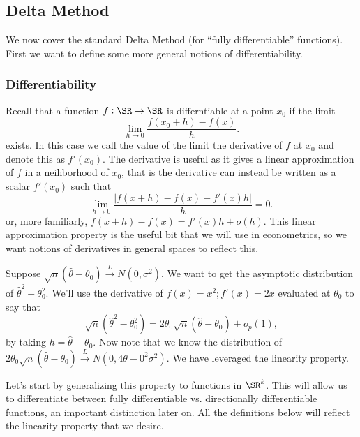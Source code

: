 
\subsection{Delta Method}%
\label{subsec:delta-method}

We now cover the standard Delta Method (for ``fully differentiable'' functions). First we want to define some more general notions of differentiability.

\subsubsection{Differentiability}%
\label{subsubsec:differentiability}

Recall that a function \(f:\SR\to\SR\) is differntiable at a point \(x_0\) if the limit
\[
	\lim_{h\to0} \frac{f(x_0+h)-f(x)}{h} 
.\] 
exists. In this case we call the value of the limit the derivative of \(f\) at \(x_0\) and denote this as \(f'(x_0)\). The derivative is useful as it gives a linear approximation of \(f\) in a neihborhood of \(x_0\), that is the derivative can instead be written as a scalar  \(f'(x_0)\) such that
\[
	 \lim_{h\to 0}\frac{|f(x+h)-f(x)-f'(x)h|}{h} = 0 
.\] 
or, more familiarly, \(f(x+h)-f(x) = f'(x)h + o(h)\). This linear approximation property is the useful bit that we will use in econometrics, so we want notions of derivatives in general spaces to reflect this.
\begin{example*}
	Suppose \(\sqrt{n}\left(\hat\theta-\theta_0\right)\overset{L}{\to}N(0,\sigma^2)\). We want to get the asymptotic distribution of \(\hat\theta^2-\theta_0^2\). We'll use the derivative of \(f(x)=x^2; f'(x)=2x\) evaluated at \(\theta_0\) to say that 
	\[
		\sqrt{n}\left(\hat\theta^2-\theta_0^2\right) = 2\theta_0\sqrt{n}\left(\hat\theta-\theta_0\right) + o_p(1)
	,\]
	by taking \(h = \hat\theta-\theta_0\). Now note that we know the distribution of \(2\theta_0\sqrt{n}\left(\hat\theta-\theta_0\right) \overset{L}{\to} N(0,4\theta-0^2\sigma^2)\). We have leveraged the linearity property.
\end{example*}

Let's start by generalizing this property to functions in \(\SR^k\). This will allow us to differentiate between fully differentiable vs. directionally differentiable functions, an important distinction later on. All the definitions below will reflect the linearity property that  we desire.

